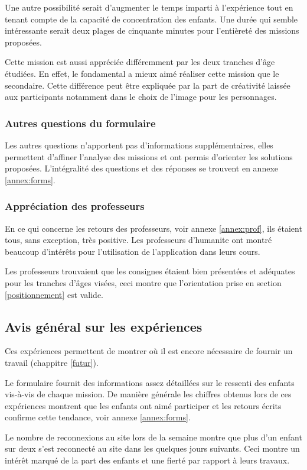 Une autre possibilité serait d'augmenter le temps imparti à l'expérience tout en tenant compte de la capacité de concentration des enfants. Une durée qui semble intéressante serait deux plages de cinquante minutes pour l'entièreté des missions proposées.

Cette \gls{mission} est aussi appréciée différemment par les deux tranches d'âge étudiées. En effet, le \gls{fondamental} a mieux aimé réaliser cette \gls{mission} que le \gls{secondaire}. Cette différence peut être expliquée par la part de créativité laissée aux participants notamment dans le choix de l'image pour les personnages.
\subsubsection{Autres questions du formulaire}
Les autres questions n'apportent pas d'informations supplémentaires, elles permettent d'affiner l'analyse des missions et ont permis d'orienter les solutions proposées. L'intégralité des questions et des réponses se trouvent en annexe \ref{annex:forms}.
\subsubsection{Appréciation des professeurs}
En ce qui concerne les retours des professeurs, voir annexe \ref{annex:prof}, ils étaient tous, sans exception, très positive. Les professeurs d'\gls{humanite} ont montré beaucoup d'intérêts pour l'utilisation de l'application dans leurs cours.

Les professeurs trouvaient que les consignes étaient bien présentées et adéquates pour les tranches d'âges visées, ceci montre que l'orientation prise en section \ref{positionnement} est valide.



\subsection{Avis général sur les expériences}
Ces expériences permettent de montrer où il est encore nécessaire de fournir un travail (chappitre \ref{futur}).

Le formulaire fournit des informations assez détaillées sur le ressenti des enfants vis-à-vis de chaque mission. De manière générale les chiffres obtenus lors de ces expériences montrent que les enfants ont aimé participer et les retours écrits confirme cette tendance, voir annexe \ref{annex:forms}.

Le nombre de reconnexions au site lors de la semaine montre que plus d'un enfant sur deux s'est reconnecté au site dans les quelques jours suivants. Ceci montre un intérêt marqué de la part des enfants et une fierté par rapport à leurs travaux.
